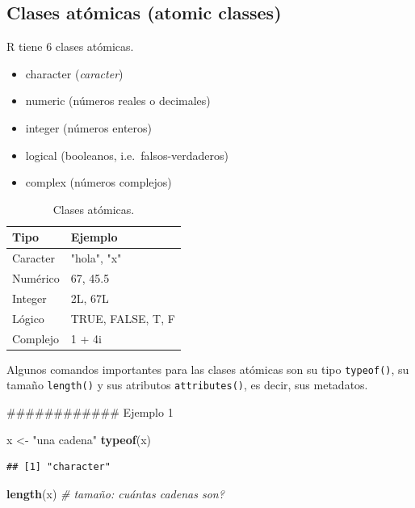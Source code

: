 \documentclass[]{article}
\newenvironment{Shaded}{\begin{snugshade}}{\end{snugshade}}
\newcommand{\KeywordTok}[1]{\textcolor[rgb]{0.13,0.29,0.53}{\textbf{{#1}}}}
\newcommand{\StringTok}[1]{\textcolor[rgb]{0.31,0.60,0.02}{{#1}}}
\newcommand{\CommentTok}[1]{\textcolor[rgb]{0.56,0.35,0.01}{\textit{{#1}}}}
\newcommand{\NormalTok}[1]{{#1}}
\providecommand{\tightlist}{%
  \setlength{\itemsep}{0pt}\setlength{\parskip}{0pt}}
\begin{document}
\subsection{Clases atómicas (atomic
classes)}\label{clases-atomicas-atomic-classes}

R tiene 6 clases atómicas.

\begin{itemize}
\tightlist
\item
  character (\emph{caracter})
\item
  numeric (números reales o decimales)
\item
  integer (números enteros)
\item
  logical (booleanos, i.e.~falsos-verdaderos)
\item
  complex (números complejos)
\end{itemize}

\begin{table}[ht]
\centering
\begin{tabular}{p{3cm}p{5cm}}
  \hline
Tipo & Ejemplo \\ 
  \hline
Caracter & "hola", "x" \\ 
Numérico & 67, 45.5 \\
Integer & 2L, 67L \\
Lógico & TRUE, FALSE, T, F \\
Complejo & 1 + 4i\\
   \hline
\end{tabular}
\caption{Clases atómicas.}
\end{table}

Algunos comandos importantes para las clases atómicas son su tipo
\texttt{typeof()}, su tamaño \texttt{length()} y sus atributos
\texttt{attributes()}, es decir, sus metadatos.

\begin{Shaded}
\begin{Highlighting}[]
\NormalTok{############ Ejemplo 1}

\NormalTok{x <-}\StringTok{ "una cadena"}
\KeywordTok{typeof}\NormalTok{(x)}
\end{Highlighting}
\end{Shaded}

\begin{verbatim}
## [1] "character"
\end{verbatim}

\begin{Shaded}
\begin{Highlighting}[]
\KeywordTok{length}\NormalTok{(x) }\CommentTok{# tamaño: cuántas cadenas son?}
\end{Highlighting}
\end{Shaded}
\end{document}
